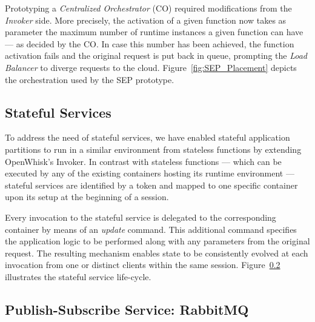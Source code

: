 Prototyping a \textit{Centralized Orchestrator} (CO) required modifications from the \textit{Invoker} side. More precisely, the activation of a given function now takes as parameter the maximum number of runtime instances a given function can have --- as decided by the CO. In case this number has been achieved, the function activation fails and the original request is put back in queue, prompting the \textit{Load Balancer} to diverge requests to the cloud. Figure~\ref{fig:SEP_Placement} depicts the orchestration used by the SEP prototype. 




\subsection{Stateful Services}

To address the need of stateful services, we have enabled stateful application partitions to run in a similar environment from stateless functions by extending OpenWhisk's Invoker. In contrast with stateless functions --- which can be executed by any of the existing containers hosting its runtime environment --- stateful services are identified by a token and mapped to one specific container upon its setup at the beginning of a session. 

Every invocation to the stateful service is delegated to the corresponding container by means of an \textit{update} command. This additional command specifies the application logic to be performed along with any parameters from the original request. The resulting mechanism enables state to be consistently evolved at each invocation from one or distinct clients within the same session. Figure~\ref{} illustrates the stateful service life-cycle.

\subsection{Publish-Subscribe Service: RabbitMQ}


